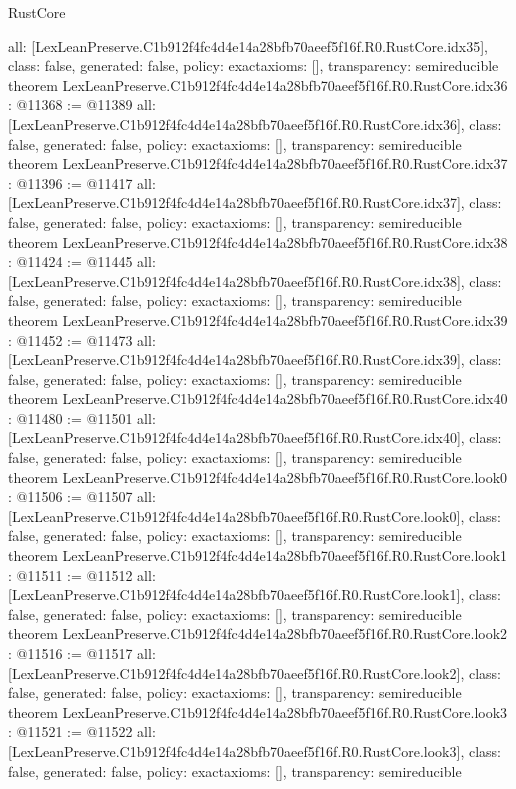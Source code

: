 \begin{lexlean}{RustCore}
\begin{coremodule}
{  all: [LexLeanPreserve.C1b912f4fc4d4e14a28bfb70aeef5f16f.R0.RustCore.idx35],
  class: false,
  generated: false,
  policy: exact{axioms: []},
  transparency: semireducible
}
theorem LexLeanPreserve.C1b912f4fc4d4e14a28bfb70aeef5f16f.R0.RustCore.idx36 : @11368 := @11389 {
  all: [LexLeanPreserve.C1b912f4fc4d4e14a28bfb70aeef5f16f.R0.RustCore.idx36],
  class: false,
  generated: false,
  policy: exact{axioms: []},
  transparency: semireducible
}
theorem LexLeanPreserve.C1b912f4fc4d4e14a28bfb70aeef5f16f.R0.RustCore.idx37 : @11396 := @11417 {
  all: [LexLeanPreserve.C1b912f4fc4d4e14a28bfb70aeef5f16f.R0.RustCore.idx37],
  class: false,
  generated: false,
  policy: exact{axioms: []},
  transparency: semireducible
}
theorem LexLeanPreserve.C1b912f4fc4d4e14a28bfb70aeef5f16f.R0.RustCore.idx38 : @11424 := @11445 {
  all: [LexLeanPreserve.C1b912f4fc4d4e14a28bfb70aeef5f16f.R0.RustCore.idx38],
  class: false,
  generated: false,
  policy: exact{axioms: []},
  transparency: semireducible
}
theorem LexLeanPreserve.C1b912f4fc4d4e14a28bfb70aeef5f16f.R0.RustCore.idx39 : @11452 := @11473 {
  all: [LexLeanPreserve.C1b912f4fc4d4e14a28bfb70aeef5f16f.R0.RustCore.idx39],
  class: false,
  generated: false,
  policy: exact{axioms: []},
  transparency: semireducible
}
theorem LexLeanPreserve.C1b912f4fc4d4e14a28bfb70aeef5f16f.R0.RustCore.idx40 : @11480 := @11501 {
  all: [LexLeanPreserve.C1b912f4fc4d4e14a28bfb70aeef5f16f.R0.RustCore.idx40],
  class: false,
  generated: false,
  policy: exact{axioms: []},
  transparency: semireducible
}
theorem LexLeanPreserve.C1b912f4fc4d4e14a28bfb70aeef5f16f.R0.RustCore.look0 : @11506 := @11507 {
  all: [LexLeanPreserve.C1b912f4fc4d4e14a28bfb70aeef5f16f.R0.RustCore.look0],
  class: false,
  generated: false,
  policy: exact{axioms: []},
  transparency: semireducible
}
theorem LexLeanPreserve.C1b912f4fc4d4e14a28bfb70aeef5f16f.R0.RustCore.look1 : @11511 := @11512 {
  all: [LexLeanPreserve.C1b912f4fc4d4e14a28bfb70aeef5f16f.R0.RustCore.look1],
  class: false,
  generated: false,
  policy: exact{axioms: []},
  transparency: semireducible
}
theorem LexLeanPreserve.C1b912f4fc4d4e14a28bfb70aeef5f16f.R0.RustCore.look2 : @11516 := @11517 {
  all: [LexLeanPreserve.C1b912f4fc4d4e14a28bfb70aeef5f16f.R0.RustCore.look2],
  class: false,
  generated: false,
  policy: exact{axioms: []},
  transparency: semireducible
}
theorem LexLeanPreserve.C1b912f4fc4d4e14a28bfb70aeef5f16f.R0.RustCore.look3 : @11521 := @11522 {
  all: [LexLeanPreserve.C1b912f4fc4d4e14a28bfb70aeef5f16f.R0.RustCore.look3],
  class: false,
  generated: false,
  policy: exact{axioms: []},
  transparency: semireducible
}
\end{coremodule}
\end{lexlean}
